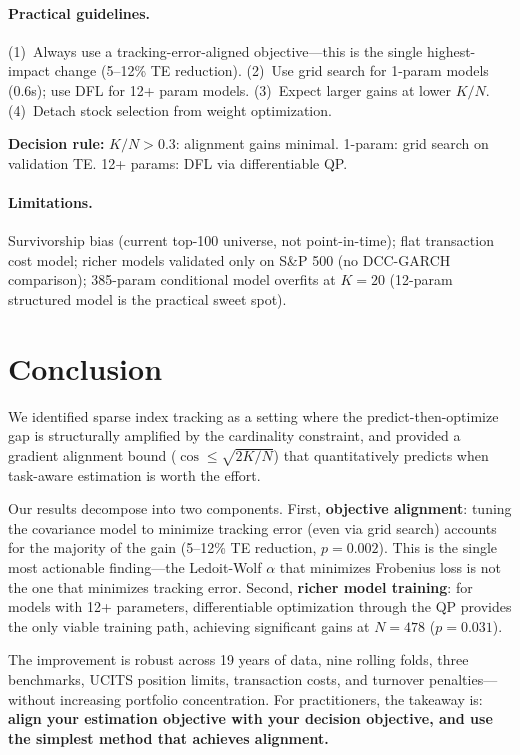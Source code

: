 \documentclass[11pt]{article}
\begin{document}
\paragraph{Practical guidelines.}
(1)~Always use a tracking-error-aligned objective---this is the single highest-impact change (5--12\% TE reduction).
(2)~Use grid search for 1-param models (0.6s); use DFL for 12+ param models.
(3)~Expect larger gains at lower $K/N$.
(4)~Detach stock selection from weight optimization.

\textbf{Decision rule:} $K/N > 0.3$: alignment gains minimal. 1-param: grid search on validation TE. 12+ params: DFL via differentiable QP.

\paragraph{Limitations.}
Survivorship bias (current top-100 universe, not point-in-time); flat transaction cost model; richer models validated only on S\&P 500 (no DCC-GARCH comparison); 385-param conditional model overfits at $K{=}20$ (12-param structured model is the practical sweet spot).

\section{Conclusion}
\label{sec:conclusion}

We identified sparse index tracking as a setting where the predict-then-optimize gap is structurally amplified by the cardinality constraint, and provided a gradient alignment bound ($\cos \leq \sqrt{2K/N}$) that quantitatively predicts when task-aware estimation is worth the effort.

Our results decompose into two components. First, \textbf{objective alignment}: tuning the covariance model to minimize tracking error (even via grid search) accounts for the majority of the gain (5--12\% TE reduction, $p = 0.002$). This is the single most actionable finding---the Ledoit-Wolf $\alpha$ that minimizes Frobenius loss is not the one that minimizes tracking error. Second, \textbf{richer model training}: for models with 12+ parameters, differentiable optimization through the QP provides the only viable training path, achieving significant gains at $N{=}478$ ($p = 0.031$).

The improvement is robust across 19 years of data, nine rolling folds, three benchmarks, UCITS position limits, transaction costs, and turnover penalties---without increasing portfolio concentration. For practitioners, the takeaway is: \textbf{align your estimation objective with your decision objective, and use the simplest method that achieves alignment.}
\end{document}
